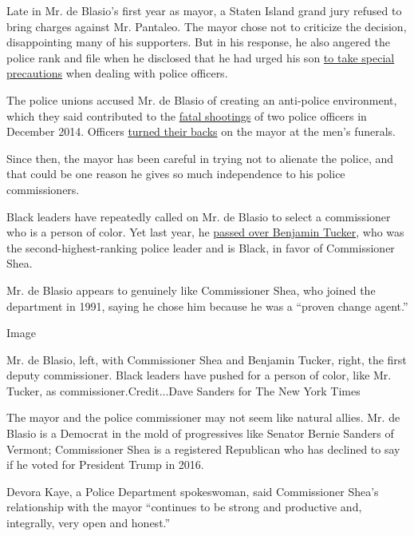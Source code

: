 Late in Mr. de Blasio's first year as mayor, a Staten Island grand jury
refused to bring charges against Mr. Pantaleo. The mayor chose not to
criticize the decision, disappointing many of his supporters. But in his
response, he also angered the police rank and file when he disclosed
that he had urged his son
\href{http://www.nytimes3xbfgragh.onion/2014/12/04/nyregion/de-blasio-reacts-as-mayor-and-a-father-to-chokehold-case-decision.html?_r=0}{to
take special precautions} when dealing with police officers.

The police unions accused Mr. de Blasio of creating an anti-police
environment, which they said contributed to the
\href{https://www.nytimes3xbfgragh.onion/2014/12/21/nyregion/two-police-officers-shot-in-their-patrol-car-in-brooklyn.html}{fatal
shootings} of two police officers in December 2014. Officers
\href{https://www.nytimes3xbfgragh.onion/2015/01/05/nyregion/police-officers-gather-for-the-funeral-of-wenjian-liu-killed-in-an-ambush.html}{turned
their backs} on the mayor at the men's funerals.

Since then, the mayor has been careful in trying not to alienate the
police, and that could be one reason he gives so much independence to
his police commissioners.

Black leaders have repeatedly called on Mr. de Blasio to select a
commissioner who is a person of color. Yet last year, he
\href{https://www.nytimes3xbfgragh.onion/2019/11/05/nyregion/nypd-police-commissioner-de-blasio.html}{passed
over Benjamin Tucker}, who was the second-highest-ranking police leader
and is Black, in favor of Commissioner Shea.

Mr. de Blasio appears to genuinely like Commissioner Shea, who joined
the department in 1991, saying he chose him because he was a ``proven
change agent.''

Image

Mr. de Blasio, left, with Commissioner Shea and Benjamin Tucker, right,
the first deputy commissioner. Black leaders have pushed for a person of
color, like Mr. Tucker, as commissioner.Credit...Dave Sanders for The
New York Times

The mayor and the police commissioner may not seem like natural allies.
Mr. de Blasio is a Democrat in the mold of progressives like Senator
Bernie Sanders of Vermont; Commissioner Shea is a registered Republican
who has declined to say if he voted for President Trump in 2016.

Devora Kaye, a Police Department spokeswoman, said Commissioner Shea's
relationship with the mayor ``continues to be strong and productive and,
integrally, very open and honest.''

